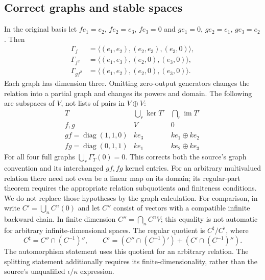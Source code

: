 \documentclass[11pt,oneside,openany]{book}
\theoremstyle{definition}\newtheorem{definition}[theorem]{Definition}
\theoremstyle{remark}\newtheorem{remark}[theorem]{Remark}
\begin{document}
\subsection{Correct graphs and stable spaces}
In the original basis let $f e_1=e_2$, $f e_2=e_3$, $f e_3=0$ and
$g e_1=0$, $g e_2=e_1$, $g e_3=e_2$. Then
\[
\begin{split}
 \Gamma_f&=\langle(e_1,e_2),(e_2,e_3),(e_3,0)\rangle,\\
 \Gamma_{f^2}&=\langle(e_1,e_3),(e_2,0),(e_3,0)\rangle,\\
 \Gamma_{gf^2}&=\langle(e_1,e_2),(e_2,0),(e_3,0)\rangle.
\end{split}
\]
Each graph has dimension three. Omitting zero-output generators changes
the relation into a partial graph and changes its powers and domain.
The following are subspaces of $V$, not lists of pairs in $V\oplus V$:
\[
\begin{array}{c|cc}
T&\bigcup_r\ker T^r&\bigcap_r\operatorname{im}T^r\\\hline
f,g&V&0\\
gf=\operatorname{diag}(1,1,0)&ke_3&ke_1\oplus ke_2\\
fg=\operatorname{diag}(0,1,1)&ke_1&ke_2\oplus ke_3
\end{array}
\]
For all four full graphs $\bigcup_r\Gamma_T^r(0)=0$. This corrects both
the source's graph convention and its interchanged $gf,fg$ kernel entries.
For an arbitrary multivalued relation there need not even be a linear map
on its domain; its regular-part theorem requires the appropriate relation
subquotients and finiteness conditions. We do not replace those hypotheses
by the graph calculation.
For comparison, in \cite[Section 4, Lemmas 4.2,4.5--4.6]{CrawleyBoeveyStrings}
write $C'=\bigcup_n C^n(0)$ and let $C''$ consist of vectors with a
compatible infinite backward chain. In finite dimension $C''=\bigcap_n C^nV$;
this equality is not automatic for arbitrary infinite-dimensional spaces.
The regular quotient is $C^\sharp/C^\flat$, where
\[
 C^\sharp=C''\cap(C^{-1})'',\qquad
 C^\flat=(C''\cap(C^{-1})')+(C'\cap(C^{-1})'').
\]
The automorphism statement uses this quotient for an arbitrary relation.
The splitting statement additionally requires its finite-dimensionality,
rather than the source's unqualified $\iota/\kappa$ expression.
\end{document}
